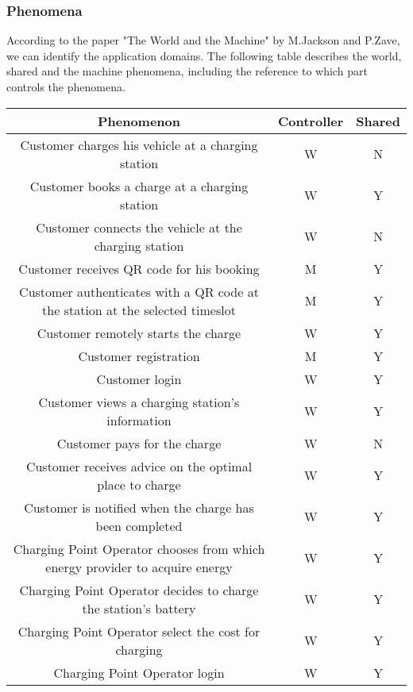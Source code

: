 \subsubsection{Phenomena}
According to the paper "The World and the Machine" by M.Jackson and P.Zave, 
we can identify the application domains. 
The following table describes the world, shared and the machine phenomena, 
including the reference to which part controls the phenomena.
\begin{table}[!h]
        \centering
        \begin{tabular}{|c|c|c|}
        \hline
        \textbf{Phenomenon}                                        & \textbf{Controller} & \textbf{Shared} \\ \hline
        Customer charges his vehicle at a charging station  & W          & N      \\ \hline
        Customer books a charge at a charging station         & W          & Y      \\ \hline
        Customer connects the vehicle at the charging station              & W          & N      \\ \hline
        Customer receives QR code for his booking      & M          & Y      \\ \hline
        Customer authenticates with a QR code at the station at the selected timeslot      & M          & Y      \\ \hline
        Customer remotely starts the charge                   & W          & Y      \\ \hline       
        Customer registration                                 & M          & Y      \\ \hline
        Customer login                                        & W          & Y      \\ \hline
        Customer views a charging station's information       & W          & Y      \\ \hline
        Customer pays for the charge                          & W          & N      \\ \hline
        Customer receives advice on the optimal place to charge            & W          & Y      \\ \hline
        Customer is notified when the charge has been completed   & W          & Y      \\ \hline
        Charging Point Operator chooses from which energy provider to acquire energy   & W          & Y      \\ \hline
        Charging Point Operator decides to charge the station's battery    & W          & Y      \\ \hline
        Charging Point Operator select the cost for charging &W          & Y      \\ \hline
        Charging Point Operator login &W          & Y      \\ \hline
       \end{tabular}
\end{table}

